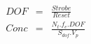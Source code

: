 \begin{eqnarray*}
DOF & = & \frac{Strobe}{Reset} \\
Conc & =  & \frac{N_t.f_e.DOF}{S_{dof}.V_p} \\ 
\end{eqnarray*}
